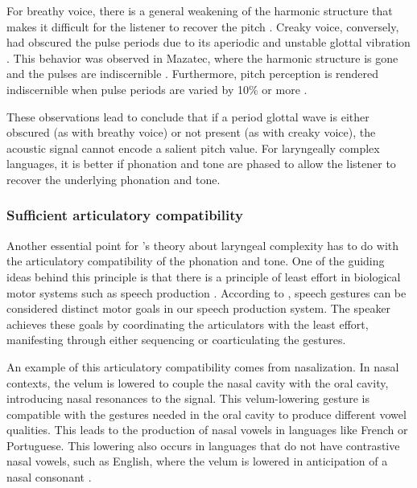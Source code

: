 For breathy voice, there is a general weakening
of the harmonic structure that makes it difficult for the listener to recover the pitch \citep{silvermanPhasingRecoverability1997}. Creaky voice, conversely, had obscured the pulse periods due to its aperiodic and unstable glottal vibration \citep{ladefogedSoundsWorldsLanguages1996}. This behavior was observed in Mazatec, where the harmonic structure is gone and the pulses are indiscernible \citep{kirkQuantifyingAcousticProperties1993}. Furthermore, pitch perception is rendered indiscernible when pulse periods are varied by 10\% or more \citep{rosenbergPitchDiscriminationJittered1966}.

These observations lead \citet{silvermanLaryngealComplexityOtomanguean1997} to conclude that if a period glottal wave is either obscured (as with breathy voice) or not present (as with creaky voice), the acoustic signal cannot encode a salient pitch value. For laryngeally complex languages, it is better if phonation and tone are phased to allow the listener to recover the underlying phonation and tone.

\subsubsection{Sufficient articulatory compatibility}\label{sec:sufficient_articulatory_compatibility}

Another essential point for \citeauthor{silvermanLaryngealComplexityOtomanguean1997}'s theory about laryngeal complexity has to do with the articulatory compatibility of the phonation and tone. One of the guiding ideas behind this principle is that there is a principle of least effort in biological motor systems such as speech production \citep{lindblomEconomySpeechGestures1983}. According to \citet{lindblomEconomySpeechGestures1983}, speech gestures can be considered distinct motor goals in our speech production system. The speaker achieves these goals by coordinating the articulators with the least effort, manifesting through either sequencing or coarticulating the gestures.

An example of this articulatory compatibility comes from nasalization. In nasal contexts, the velum is lowered to couple the nasal cavity with the oral cavity, introducing nasal resonances to the signal. This velum-lowering gesture is compatible with the gestures needed in the oral cavity to produce different vowel qualities. This leads to the production of nasal vowels in languages like French or Portuguese. This lowering also occurs in languages that do not have contrastive nasal vowels, such as English, where the velum is lowered in anticipation of a nasal consonant \citep[e.g.,][]{ohalaPhoneticExplanationsNasal1975}.

